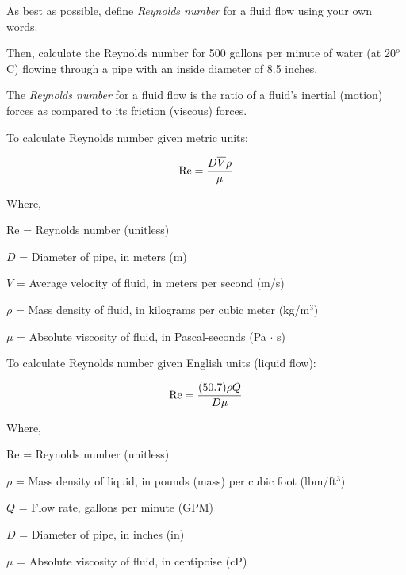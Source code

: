 

As best as possible, define {\it Reynolds number} for a fluid flow using your own words.

\vskip 10pt

Then, calculate the Reynolds number for 500 gallons per minute of water (at 20$^{o}$ C) flowing through a pipe with an inside diameter of 8.5 inches.







The {\it Reynolds number} for a fluid flow is the ratio of a fluid's inertial (motion) forces as compared to its friction (viscous) forces.

\vskip 30pt
 
To calculate Reynolds number given metric units:

$$\hbox{Re} = {{D \overline{V} \rho} \over \mu}$$

\noindent
Where,

Re = Reynolds number (unitless)

$D$ = Diameter of pipe, in meters (m)

$\overline{V}$ = Average velocity of fluid, in meters per second (m/s)

$\rho$ = Mass density of fluid, in kilograms per cubic meter (kg/m$^{3}$)

$\mu$ = Absolute viscosity of fluid, in Pascal-seconds (Pa $\cdot$ s)

\vskip 60pt \goodbreak

To calculate Reynolds number given English units (liquid flow):

$$\hbox{Re} = {{(50.7) \rho Q} \over {D \mu}}$$

\noindent
Where,

Re = Reynolds number (unitless)

$\rho$ = Mass density of liquid, in pounds (mass) per cubic foot (lbm/ft$^{3}$)

$Q$ = Flow rate, gallons per minute (GPM)

$D$ = Diameter of pipe, in inches (in)

$\mu$ = Absolute viscosity of fluid, in centipoise (cP)

\vskip 60pt \goodbreak

